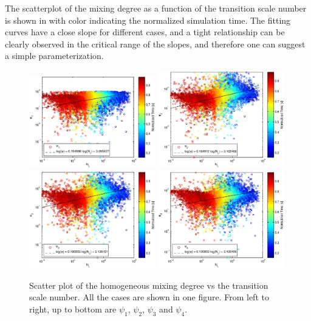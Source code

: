 The scatterplot of the mixing degree as a function of the transition scale number is shown in  with color indicating the normalized simulation time. The fitting curves have a close slope for different cases, and a tight relationship can be clearly observed in the critical range of the slopes, and therefore one can suggest a simple parameterization.
\begin{figure}[H]\centering
\includegraphics[width=0.49\textwidth]{Figures/phi1_NL}
\includegraphics[width=0.49\textwidth]{Figures/phi2_NL}\\
\includegraphics[width=0.49\textwidth]{Figures/phi3_NL}
\includegraphics[width=0.49\textwidth]{Figures/phi4_NL}
\caption{Scatter plot of the homogeneous mixing degree vs the transition scale number. All the cases are shown in one figure. From left to right, up to bottom are $\psi_1$, $\psi_2$, $\psi_3$ and $\psi_4$.\label{fig:mix_degree_nl}}
\end{figure}


